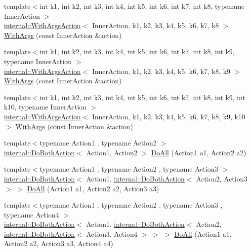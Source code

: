 \begin{DoxyCompactItemize}
\item 
{\footnotesize template$<$int k1, int k2, int k3, int k4, int k5, int k6, int k7, int k8, typename Inner\+Action $>$ }\\\mbox{\hyperlink{structtesting_1_1internal_1_1_with_args_action}{internal\+::\+With\+Args\+Action}}$<$ Inner\+Action, k1, k2, k3, k4, k5, k6, k7, k8 $>$ \mbox{\hyperlink{namespacetesting_a16c131c0d58ae07d2e1ee6c7a44aaad1}{With\+Args}} (const Inner\+Action \&action)
\item 
{\footnotesize template$<$int k1, int k2, int k3, int k4, int k5, int k6, int k7, int k8, int k9, typename Inner\+Action $>$ }\\\mbox{\hyperlink{structtesting_1_1internal_1_1_with_args_action}{internal\+::\+With\+Args\+Action}}$<$ Inner\+Action, k1, k2, k3, k4, k5, k6, k7, k8, k9 $>$ \mbox{\hyperlink{namespacetesting_a6aec78e6c201b150c78271e3f851414e}{With\+Args}} (const Inner\+Action \&action)
\item 
{\footnotesize template$<$int k1, int k2, int k3, int k4, int k5, int k6, int k7, int k8, int k9, int k10, typename Inner\+Action $>$ }\\\mbox{\hyperlink{structtesting_1_1internal_1_1_with_args_action}{internal\+::\+With\+Args\+Action}}$<$ Inner\+Action, k1, k2, k3, k4, k5, k6, k7, k8, k9, k10 $>$ \mbox{\hyperlink{namespacetesting_a768a620ad07c6b5822201fa4f15fb4f0}{With\+Args}} (const Inner\+Action \&action)
\item 
{\footnotesize template$<$typename Action1 , typename Action2 $>$ }\\\mbox{\hyperlink{classtesting_1_1internal_1_1_do_both_action}{internal\+::\+Do\+Both\+Action}}$<$ Action1, Action2 $>$ \mbox{\hyperlink{namespacetesting_a5f533932753d2af95000e96c4a3042e3}{Do\+All}} (Action1 a1, Action2 a2)
\item 
{\footnotesize template$<$typename Action1 , typename Action2 , typename Action3 $>$ }\\\mbox{\hyperlink{classtesting_1_1internal_1_1_do_both_action}{internal\+::\+Do\+Both\+Action}}$<$ Action1, \mbox{\hyperlink{classtesting_1_1internal_1_1_do_both_action}{internal\+::\+Do\+Both\+Action}}$<$ Action2, Action3 $>$ $>$ \mbox{\hyperlink{namespacetesting_ad6a3ce5e229120ea287286a86394d712}{Do\+All}} (Action1 a1, Action2 a2, Action3 a3)
\item 
{\footnotesize template$<$typename Action1 , typename Action2 , typename Action3 , typename Action4 $>$ }\\\mbox{\hyperlink{classtesting_1_1internal_1_1_do_both_action}{internal\+::\+Do\+Both\+Action}}$<$ Action1, \mbox{\hyperlink{classtesting_1_1internal_1_1_do_both_action}{internal\+::\+Do\+Both\+Action}}$<$ Action2, \mbox{\hyperlink{classtesting_1_1internal_1_1_do_both_action}{internal\+::\+Do\+Both\+Action}}$<$ Action3, Action4 $>$ $>$ $>$ \mbox{\hyperlink{namespacetesting_a790ce08c80a1f8ececa0f2a4f678247c}{Do\+All}} (Action1 a1, Action2 a2, Action3 a3, Action4 a4)

\end{DoxyCompactItemize}
